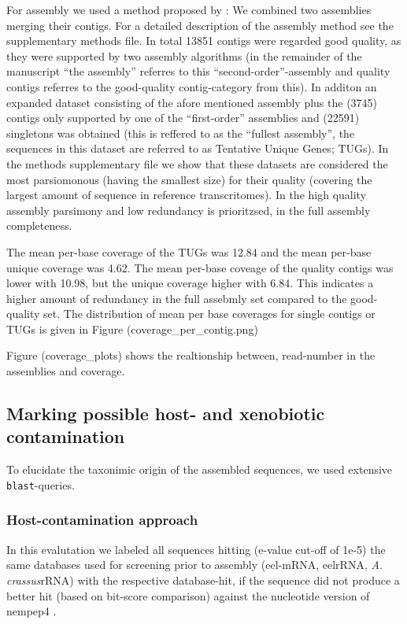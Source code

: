 \documentclass[10pt]{bmc_article}
\newenvironment{bmcformat}{\begin{raggedright}\baselineskip20pt\sloppy\setboolean{publ}{false}}{\end{raggedright}\baselineskip20pt\sloppy}
\begin{document}
\begin{bmcformat}
For assembly we used a method proposed by \cite{pmid20950480}: We
combined two assemblies merging their contigs. For a detailed
description of the assembly method see the supplementary methods
file. In total 13851 contigs were regarded good quality, as they
were supported by two assembly algorithms (in the remainder of the
manuscript ``the assembly'' referres to this ``second-order''-assembly
and quality contigs referres to the good-quality contig-category from
this). In additon an expanded dataset consisting of the afore
mentioned assembly plus the (3745) contigs only supported by
one of the ``first-order'' assemblies and (22591) singletons
was obtained (this is reffered to as the ``fullest assembly'', the
sequences in this dataset are referred to as Tentative Unique Genes;
TUGs). In the methods supplementary file we show that these datasets
are considered the most parsiomonous (having the smallest size) for
their quality (covering the largest amount of sequence in reference
transcritomes). In the high quality assembly parsimony and low
redundancy is prioritzsed, in the full assembly completeness.


The mean per-base coverage of the TUGs was 12.84 and the mean
per-base unique coverage was 4.62. The mean per-base coveage
of the quality contigs was lower with 10.98, but the unique
coverage higher with 6.84. This indicates a higher amount
of redundancy in the full assebmly set compared to the good-quality
set. The distribution of mean per base coverages for single contigs or
TUGs is given in Figure (coverage\_per\_contig.png)

Figure (coverage\_plots) shows the realtionship between, read-number
in the assemblies and coverage.

\subsection*{Marking possible host- and xenobiotic contamination}


To elucidate the taxonimic origin of the assembled sequences, we used
extensive \texttt{blast}-queries.

\subsubsection*{Host-contamination approach}

In this evalutation we labeled all sequences hitting (e-value
cut-off of 1e-5) the same databases used for screening prior to
assembly (eel-mRNA, eelrRNA, \textit{A. crassus}rRNA) with the
respective database-hit, if the sequence did not produce a better hit
(based on bit-score comparison) against the nucleotide version of
nempep4 \cite{pmid21550347}.  


\end{bmcformat}
\end{document}
